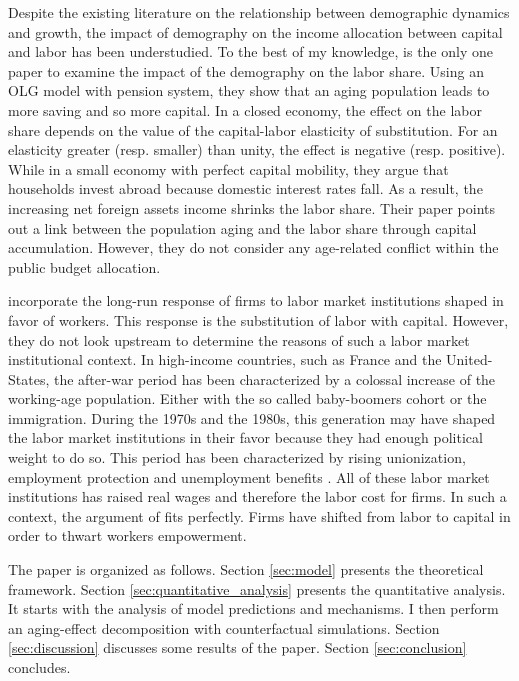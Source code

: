 
Despite the existing literature on the relationship between demographic dynamics and growth, the impact of demography on the income allocation between capital and labor has been understudied. 
To the best of my knowledge, \cite{Schmidt2013} is the only one paper to examine the impact of the demography on the labor share. Using an OLG model with pension system, they show that an aging population leads to more saving and so more capital. In a closed economy, the effect on the labor share depends on the value of the capital-labor elasticity of substitution. For an elasticity greater (resp. smaller) than unity, the effect is negative (resp. positive). While in a small economy with perfect capital mobility, they argue that households invest abroad because domestic interest rates fall. As a result, the increasing net foreign assets income shrinks the labor share. Their paper points out a link between the population aging and the labor share through capital accumulation. However, they do not consider any age-related conflict within the public budget allocation.

\cite{Caballero1998} incorporate the long-run response of firms to labor market institutions shaped in favor of workers. This response is the substitution of labor with capital. However, they do not look upstream to determine the reasons of such a labor market institutional context. In high-income countries, such as France and the United-States, the after-war period has been characterized by a colossal increase of the working-age population. Either with the so called baby-boomers cohort or the immigration. During the 1970s and the 1980s, this generation may have shaped the labor market institutions in their favor because they had enough political weight to do so. This period has been characterized by rising unionization, employment protection and unemployment benefits%
. All of these labor market institutions has raised real wages and therefore the labor cost for firms. In such a context, the argument of \cite{Caballero1998} fits perfectly. Firms have shifted from labor to capital in order to thwart workers empowerment.



The paper is organized as follows. Section \ref{sec:model} presents the theoretical framework. Section \ref{sec:quantitative_analysis} presents the quantitative analysis. It starts with the analysis of model predictions and mechanisms. I then perform an aging-effect decomposition with counterfactual simulations. Section \ref{sec:discussion} discusses some results of the paper. Section \ref{sec:conclusion} concludes.

